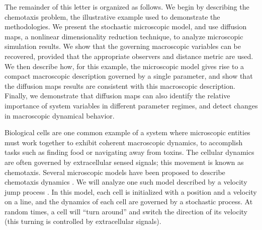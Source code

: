 \documentclass[prl, reprint, final, showkeys]{revtex4-1}
\begin{document}
The remainder of this letter is organized as follows. 
%
We begin by describing the chemotaxis problem, the illustrative example used to demonstrate the methodologies.
%
We present the stochastic microscopic model, and use diffusion maps, a nonlinear dimensionality reduction technique, to analyze microscopic simulation results.
%
We show that the governing macroscopic variables can be recovered, provided that the appropriate observers and distance metric are used.
%
We then describe how, for this example, the microscopic model gives rise to a compact macroscopic description governed by a single parameter, and show that the diffusion maps results are consistent with this macroscopic description. 
%
Finally, we demonstrate that diffusion maps can also identify the relative importance of system variables in different parameter regimes, and detect changes in macroscopic dynamical behavior.



Biological cells are one common example of a system where microscopic entities must work together to exhibit coherent macroscopic dynamics, to accomplish tasks such as finding food or navigating away from toxins.
%
The cellular dynamics are often governed by extracellular sensed signals; this movement is known as chemotaxis. 
%
Several microscopic models have been proposed to describe chemotaxis dynamics \cite{othmer1988models, codling2008random}.
%
We will analyze one such model described by a velocity jump process \cite{othmer2000diffusion}.
%
In this model, each cell is initialized with a position and a velocity on a line, and the dynamics of each cell are governed by a stochastic process.
%
At random times, a cell will ``turn around'' and switch the direction of its velocity (this turning is controlled by extracellular signals). 
%

\end{document}
